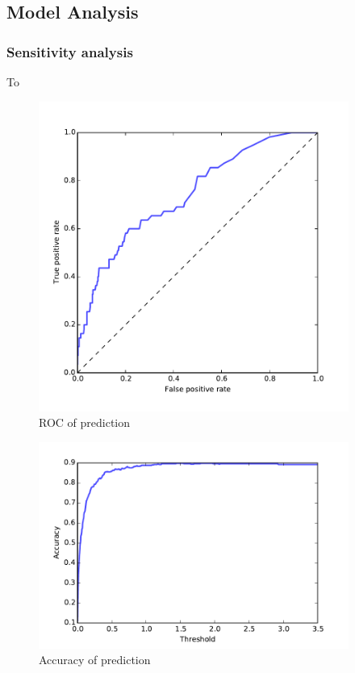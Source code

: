 \documentclass[11pt]{article}
\begin{document}
\subsection{Model Analysis}

\subsubsection{Sensitivity analysis}

To 





\begin{figure}[hbt]
\begin{center}
  \includegraphics[width=4in]{graph/roc.pdf}
  \caption{ROC of prediction}
  \label{roc}
\end{center}  
\end{figure}

\begin{figure}[hbt]
\begin{center}
  \includegraphics[width=4in]{graph/acc.pdf}
  \caption{Accuracy of prediction}
  \label{acc}
\end{center}  
\end{figure}
\end{document}

